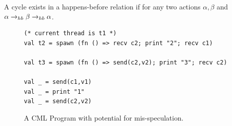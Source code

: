 \begin{definition}
A cycle exists in a happens-before relation if for any two actions
$\alpha, \beta$ and $\alpha \rightarrow_{hb} \beta \rightarrow_{hb} \alpha$.
\end{definition}

\lstset{numbers=none}
\begin{figure}
\begin{lstlisting}
(* current thread is t1 *)
val t2 = spawn (fn () => recv c2; print "2"; recv c1)

val t3 = spawn (fn () => send(c2,v2); print "3"; recv c2)

val _ = send(c1,v1)
val _ = print "1"
val _ = send(c2,v2)
\end{lstlisting}
\caption{A CML Program with potential for mis-speculation.}
\label{code:simple}
\end{figure}
\lstset{numbers=left,numberstyle=\tiny,stepnumber=1,frame=single}

